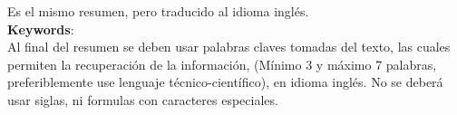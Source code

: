 Es el mismo resumen, pero traducido al idioma inglés.\\

\noindent \textbf{Keywords}:\\
Al final del resumen se deben usar palabras claves tomadas del texto, las cuales permiten la recuperación de la información, (Mínimo 3 y máximo 7 palabras, preferiblemente use lenguaje técnico-científico), en idioma inglés. No se deberá usar siglas, ni formulas con caracteres especiales.